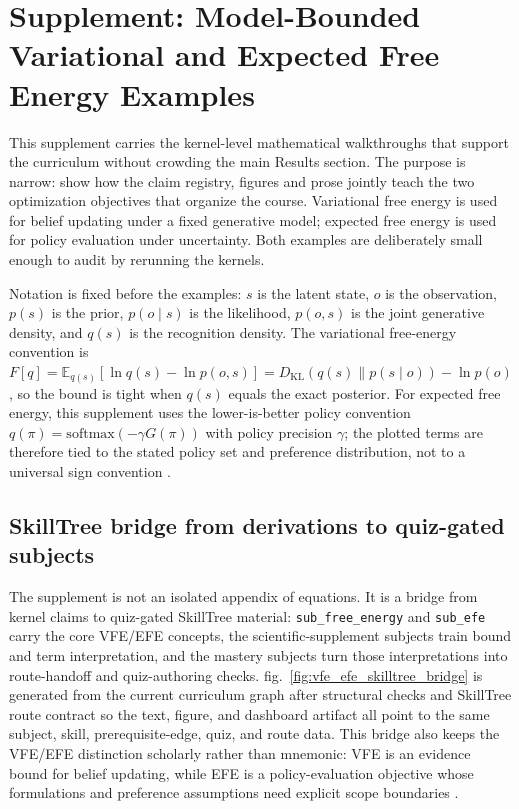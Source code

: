 \documentclass[
  english,
]{article}
\begin{document}
\newpage

\section{Supplement: Model-Bounded Variational and Expected Free Energy
Examples}\label{sec:supplement-vfe-efe}

This supplement carries the kernel-level mathematical walkthroughs that
support the curriculum without crowding the main Results section. The
purpose is narrow: show how the claim registry, figures and prose
jointly teach the two optimization objectives that organize the course.
Variational free energy is used for belief updating under a fixed
generative model; expected free energy is used for policy evaluation
under uncertainty. Both examples are deliberately small enough to audit
by rerunning the kernels.

Notation is fixed before the examples: \(s\) is the latent state, \(o\)
is the observation, \(p(s)\) is the prior, \(p(o\mid s)\) is the
likelihood, \(p(o,s)\) is the joint generative density, and \(q(s)\) is
the recognition density. The variational free-energy convention is
\(F[q]=\mathbb{E}_{q(s)}[\ln q(s)-\ln p(o,s)]
=D_{\mathrm{KL}}(q(s)\|p(s\mid o))-\ln p(o)\), so the bound is tight
when \(q(s)\) equals the exact posterior. For expected free energy, this
supplement uses the lower-is-better policy convention
\(q(\pi)=\mathrm{softmax}(-\gamma G(\pi))\) with policy precision
\(\gamma\); the plotted terms are therefore tied to the stated policy
set and preference distribution, not to a universal sign convention
\citep{buckley2017free, parr2022active, millidge2021whence, champion2026reframing, nuijten2026what_type_inference, nuijten2026efe_planning_vi}.

\subsection{SkillTree bridge from derivations to quiz-gated
subjects}\label{skilltree-bridge-from-derivations-to-quiz-gated-subjects}

The supplement is not an isolated appendix of equations. It is a bridge
from kernel claims to quiz-gated SkillTree material:
\texttt{sub\_free\_energy} and \texttt{sub\_efe} carry the core VFE/EFE
concepts, the scientific-supplement subjects train bound and term
interpretation, and the mastery subjects turn those interpretations into
route-handoff and quiz-authoring checks.
fig.~\ref{fig:vfe_efe_skilltree_bridge} is generated from the current
curriculum graph after structural checks and SkillTree route contract so
the text, figure, and dashboard artifact all point to the same subject,
skill, prerequisite-edge, quiz, and route data. This bridge also keeps
the VFE/EFE distinction scholarly rather than mnemonic: VFE is an
evidence bound for belief updating, while EFE is a policy-evaluation
objective whose formulations and preference assumptions need explicit
scope boundaries
\citep{buckley2017free, parr2022active, smith2022tutorial, millidge2021whence, champion2026reframing, nuijten2026what_type_inference, nuijten2026efe_planning_vi}.
\end{document}
